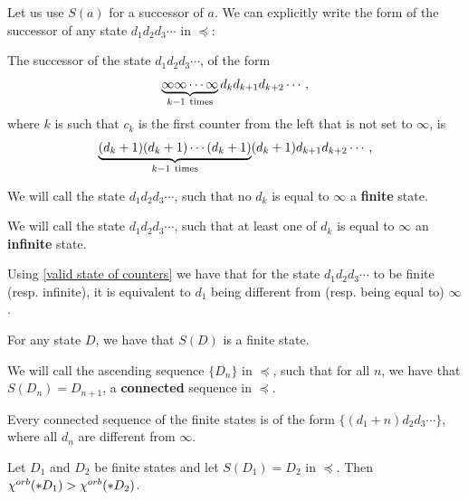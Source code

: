 Let us use $S(a)$ for a successor of $a$.
We can explicitly write the form of the successor of any state $d_1d_2d_3\cdots$ in $\preceq$:
\begin{observation}\label{form of the successor}
The successor of 
the state $d_1d_2d_3\cdots$, of the form
\begin{equation}
\underbrace{\infty\infty\cdots\infty}_{k-1 \rm\ times} d_kd_{k+1}d_{k+2}\cdots,
\end{equation}
where $k$ is 
such that $c_k$ is the first counter 
from the left that is not set to $\infty$,
is
\begin{equation} 
\underbrace{(d_k+1)(d_k+1)\cdots(d_k+1)}_{k-1\rm\ times}(d_k+1)d_{k+1}d_{k+2}\cdots,
\end{equation}

\end{observation}
\begin{definition}
We will call the state $d_1d_2d_3\cdots$, such that no $d_k$ is equal to $\infty$ a 
\textbf{finite} state. 

We will call the state $d_1d_2d_3\cdots$, such that at least one of $d_k$ is equal to $\infty$ 
an \textbf{infinite} state.  
\end{definition}
\begin{observation}
Using \ref{valid state of counters} we have that 
for the state $d_1d_2d_3\cdots$ to be finite (resp. infinite), it is equivalent to 
$d_1$ being different from (resp. being equal to) $\infty$. 
\end{observation}

\begin{observation}\label{finiteness of the successor}
For any state $D$, we have that $S(D)$ is a finite state.
\end{observation}
\begin{definition}
We will call the ascending sequence $\{D_n\}$ 
in $\preceq$, such 
that for all $n$, we have that $S(D_n) = D_{n+1}$, a \textbf{connected} sequence in 
$\preceq$.   
\end{definition}
\begin{observation}
Every connected sequence of the finite states is of the form $\{(d_1+n)d_2d_3\cdots\}$, 
where all $d_n$ are different from $\infty$.
\end{observation}
\begin{lemma}\label{Successor lemma}
Let $D_1$ and $D_2$ be finite states and let $S(D_1) = D_2$ in 
$\preceq$. Then ${\chi^{orb}(*D_1)} > {\chi^{orb}(*D_2)}$.
\end{lemma}
